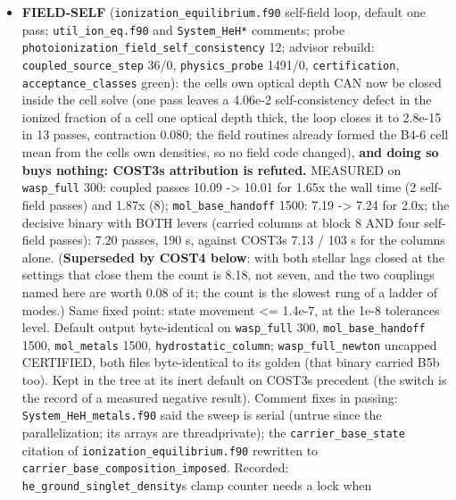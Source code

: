 \documentclass[english,a4paper]{my_memo}
\begin{document}
\begin{itemize}
  at 1e-4 to 2e-2 where an element is driven to exactly zero (deliberate
  guard, measured, documented at the test site); \texttt{element\_transport\_residual}\textquotesingle s
  dummy \texttt{v} is unread.
\item
  \textbf{FIELD-SELF} (\texttt{ionization\_equilibrium.f90} self-field loop, default one
  pass; \texttt{util\_ion\_eq.f90} and \texttt{System\_HeH*} comments; probe
  \texttt{photoionization\_field\_self\_consistency} 12; advisor rebuild:
  \texttt{coupled\_source\_step} 36/0, \texttt{physics\_probe} 1491/0, \texttt{certification},
  \texttt{acceptance\_classes} green): the cell\textquotesingle s own optical depth CAN now be
  closed inside the cell solve (one pass leaves a 4.06e-2 self-consistency
  defect in the ionized fraction of a cell one optical depth thick, the
  loop closes it to 2.8e-15 in 13 passes, contraction 0.080; the field
  routines already formed the B4-6 cell mean from the cell\textquotesingle s own densities,
  so no field code changed), \textbf{and doing so buys nothing: COST3\textquotesingle s
  attribution is refuted.} MEASURED on \texttt{wasp\_full} 300: coupled passes
  10.09 -\textgreater{} 10.01 for 1.65x the wall time (2 self-field passes) and 1.87x (8);
  \texttt{mol\_base\_handoff} 1500: 7.19 -\textgreater{} 7.24 for 2.0x; the decisive binary with
  BOTH levers (carried columns at block 8 AND four self-field passes): 7.20
  passes, 190 s, against COST3\textquotesingle s 7.13 / 103 s for the columns alone.
  (\textbf{Superseded by COST4 below}: with both stellar lags closed at the
  settings that close them the count is 8.18, not seven, and the two
  couplings named here are worth 0.08 of it; the count is the slowest rung
  of a ladder of modes.) Same fixed point: state movement \textless= 1.4e-7, at the 1e-8
  tolerance\textquotesingle s level. Default output byte-identical on \texttt{wasp\_full} 300,
  \texttt{mol\_base\_handoff} 1500, \texttt{mol\_metals} 1500, \texttt{hydrostatic\_column};
  \texttt{wasp\_full\_newton} uncapped CERTIFIED, both files byte-identical to its
  golden (that binary carried B5b too). Kept in the tree at its inert
  default on COST3\textquotesingle s precedent (the switch is the record of a measured
  negative result). Comment fixes in passing: \texttt{System\_HeH\_metals.f90} said the
  sweep is serial (untrue since the parallelization; its arrays are
  threadprivate); the \texttt{carrier\_base\_state} citation of
  \texttt{ionization\_equilibrium.f90} rewritten to \texttt{carrier\_base\_composition\_imposed}.
  Recorded: \texttt{he\_ground\_singlet\_density}\textquotesingle s clamp counter needs a lock when

\end{itemize}
\end{document}
